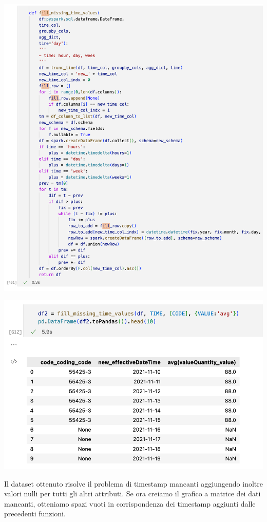 \documentclass[11pt, oneside]{article}
\begin{document}
\begin{center}
\includegraphics[scale=0.45]{3_fill_time.png}
\end{center}
\begin{center}
\includegraphics[scale=0.45]{3_fill_time_df.png}
\end{center}

Il dataset ottenuto risolve il problema di timestamp mancanti aggiungendo inoltre valori nulli per tutti gli altri attributi. Se ora creiamo il grafico a matrice dei dati mancanti, otteniamo spazi vuoti in corrispondenza dei timestamp aggiunti dalle precedenti funzioni.
\end{document}
